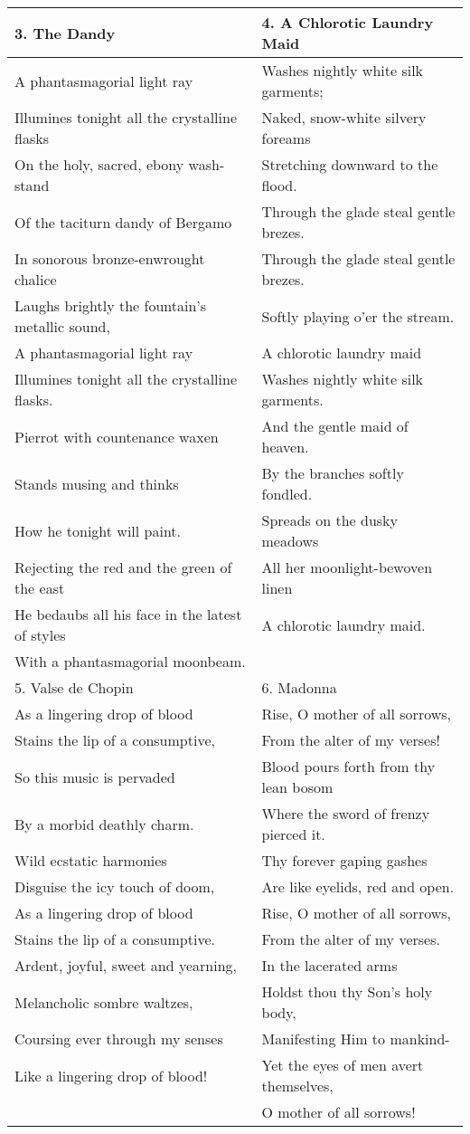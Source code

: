 \begin{table}[h!]
\begin{tabular}{p{8.0cm}|p{8.0cm}}
3. The Dandy & 4. A Chlorotic Laundry Maid \\\hline
A phantasmagorial light ray & Washes nightly white silk garments; \\
Illumines tonight all the crystalline flasks & Naked, snow-white silvery foreams \\
On the holy, sacred, ebony wash-stand & Stretching downward to the flood. \\
Of the taciturn dandy of Bergamo & Through the glade steal gentle brezes. \\
In sonorous bronze-enwrought chalice & Through the glade steal gentle brezes. \\
Laughs brightly the fountain's metallic sound, & Softly playing o'er the stream. \\
A phantasmagorial light ray & A chlorotic laundry maid \\
Illumines tonight all the crystalline flasks. & Washes nightly white silk garments. \\
Pierrot with countenance waxen & And the gentle maid of heaven. \\
Stands musing and thinks & By the branches softly fondled. \\
How he tonight will paint. & Spreads on the dusky meadows \\
Rejecting the red and the green of the east & All her moonlight-bewoven linen \\
He bedaubs all his face in the latest of styles & A chlorotic laundry maid. \\
With a phantasmagorial moonbeam. & \\\hline


5. Valse de Chopin & 6. Madonna \\\hline
As a lingering drop of blood & Rise, O mother of all sorrows,\\
Stains the lip of a consumptive, & From the alter of my verses!\\
So this music is pervaded& Blood pours forth from thy lean bosom\\
By a morbid deathly charm.& Where the sword of frenzy pierced it.\\
Wild ecstatic harmonies & Thy forever gaping gashes\\
Disguise the icy touch of doom, & Are like eyelids, red and open.\\
As a lingering drop of blood & Rise, O mother of all sorrows,\\
Stains the lip of a consumptive. & From the alter of my verses.\\
Ardent, joyful, sweet and yearning, & In the lacerated arms\\
Melancholic sombre waltzes, & Holdst thou thy Son's holy body,\\
Coursing ever through my senses & Manifesting Him to mankind-\\
Like a lingering drop of blood! & Yet the eyes of men avert themselves,\\
&  O mother of all sorrows!\\\hline
\end{tabular}
\end{table}


